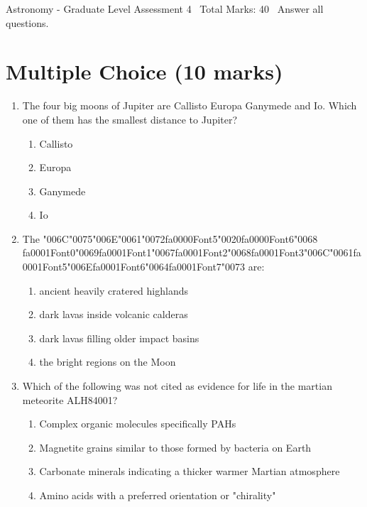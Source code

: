 \documentclass[12pt]{article}
\begin{document}
\begin{center}
Astronomy - Graduate Level Assessment 4 \
Total Marks: 40 \
Answer all questions.
\end{center}

\section*{Multiple Choice (10 marks)}
\begin{enumerate}[label=\arabic*.]
\item The four big moons of Jupiter are Callisto Europa Ganymede and Io. Which one of them has
the smallest distance to Jupiter?
\begin{enumerate}[label=(\alph*)]
    \item Callisto
    \item Europa
    \item Ganymede
    \item Io
\end{enumerate}
\item The {\char"006C}{\char"0075}{\char"006E}{\char"0061}{\char"0072}{\csname fa0000Font5\endcsname\char"0020}{\csname fa0000Font6\endcsname\char"0068} {\csname fa0001Font0\endcsname\char"0069}{\csname fa0001Font1\endcsname\char"0067}{\csname fa0001Font2\endcsname\char"0068}{\csname fa0001Font3\endcsname\char"006C}{\char"0061}{\csname fa0001Font5\endcsname\char"006E}{\csname fa0001Font6\endcsname\char"0064}{\csname fa0001Font7\endcsname\char"0073} are:
\begin{enumerate}[label=(\alph*)]
    \item ancient heavily cratered highlands
    \item dark lavas inside volcanic calderas
    \item dark lavas filling older impact basins
    \item the bright regions on the Moon
\end{enumerate}
\item Which of the following was not cited as evidence for life in the martian meteorite
ALH84001?
\begin{enumerate}[label=(\alph*)]
    \item Complex organic molecules specifically PAHs
    \item Magnetite grains similar to those formed by bacteria on Earth
    \item Carbonate minerals indicating a thicker warmer Martian atmosphere
    \item Amino acids with a preferred orientation or "chirality"

\end{enumerate}
\end{enumerate}
\end{document}
